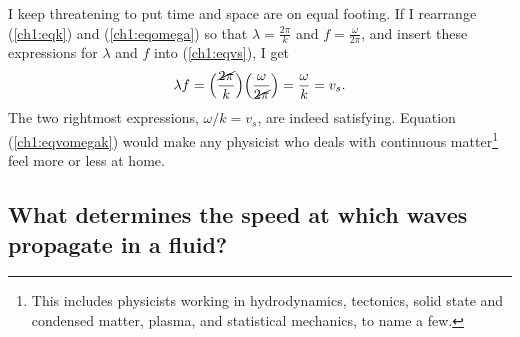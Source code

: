 

I keep threatening to put time and space are on equal footing. If I rearrange
(\ref{ch1:eqk}) and (\ref{ch1:eqomega}) so that $\lambda = \frac{2 \pi}{k}$ and
$f = \frac{\omega}{2 \pi}$, and insert these expressions for $\lambda$ and $f$
into (\ref{ch1:eqvs}), I get
\begin{equation}
  \label{ch1:eqvomegak}
  \lambda f = \Big ( \dfrac{\cancel{2 \pi}}{k} \Big ) \Big ( \dfrac{\omega}{\cancel{2 \pi}} \Big ) = \dfrac{\omega}{k} = v_s.
\end{equation}
The two rightmost expressions, $\omega / k = v_s$, are indeed
satisfying. Equation (\ref{ch1:eqvomegak}) would make any physicist who deals with
continuous matter\footnote{This includes physicists working in hydrodynamics,
  tectonics, solid state and condensed matter, plasma, and statistical
  mechanics, to name a few.} feel more or less at home.

\subsection{What determines the speed at which waves propagate in a fluid?}
\label{subsec:wavspeed}

